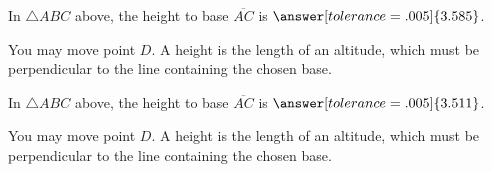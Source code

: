 \documentclass[nooutcomes]{ximera}
\begin{document}
\begin{center}  
\end{center}
\begin{problem}
In $\triangle ABC$ above, the height to base $\overline{AC}$ is $\answer[tolerance=.005]{3.585}$.
\begin{hint}
You may move point $D$.  A height is the length of an altitude, which must be perpendicular to the line containing the chosen base.  
\end{hint}
\end{problem}

\begin{center}  
\end{center}
\begin{problem}
In $\triangle ABC$ above, the height to base $\overline{AC}$ is $\answer[tolerance=.005]{3.511}$.
\begin{hint}
You may move point $D$.  A height is the length of an altitude, which must be perpendicular to the line containing the chosen base.  
\end{hint}
\end{problem}
\end{document}
